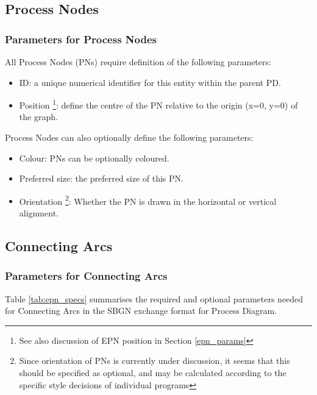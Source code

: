 \documentclass[11pt]{article}
\begin{document}
\subsection{Process Nodes}
\label{procnodes_params}

\subsubsection{Parameters for Process Nodes}
\label{pn_params}

All Process Nodes (PNs) require definition of the following parameters:

\begin{itemize}
\item ID: a unique numerical identifier for this entity within the parent PD.
\item Position \footnote{See also discussion of EPN position in Section \ref{epn_params}}: define the centre of the PN relative to the origin (x=0, y=0) of the graph.
\end{itemize}

Process Nodes can also optionally define the following parameters:
\begin{itemize}
\item Colour: PNs can be optionally coloured.
\item Preferred size: the preferred size of this PN.
\item Orientation \footnote{Since orientation of PNs is currently under discussion, it seems that this should be specified as optional, and may be calculated according to the specific style decisions of individual programs}: Whether the PN is drawn in the horizontal or vertical alignment.
\end{itemize}

\subsection{Connecting Arcs}
\label{connarcs_params}

\subsubsection{Parameters for Connecting Arcs}

Table \ref{tab:epn_specs} summarises the required and optional parameters needed for Connecting Arcs in the SBGN exchange format for Process Diagram.
\end{document}
